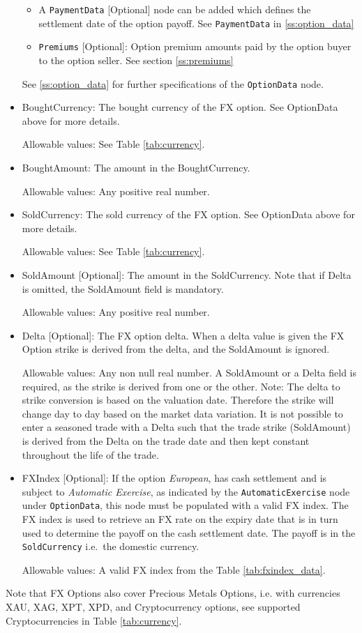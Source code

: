 \begin{itemize}
\begin{itemize}
\item A \lstinline!PaymentData! [Optional] node can be added which defines the settlement date of the option payoff. See  \lstinline!PaymentData! in \ref{ss:option_data}

\item \lstinline!Premiums! [Optional]: Option premium amounts paid by the option buyer to the option seller. See section \ref{ss:premiums}


\end{itemize}

 See \ref{ss:option_data} for further specifications of the \lstinline!OptionData! node.


\item BoughtCurrency: The bought currency of the FX option. See OptionData above for more details.

Allowable values: See Table \ref{tab:currency}.

\item BoughtAmount: The amount in the BoughtCurrency.

Allowable values: Any positive real number.

\item SoldCurrency: The sold currency of the FX option. See OptionData above for more details.

Allowable values: See Table \ref{tab:currency}.

\item SoldAmount [Optional]: The amount in the SoldCurrency. Note that if Delta is omitted, the SoldAmount field is mandatory.

Allowable values: Any positive real number.

\item Delta [Optional]: The FX option delta. When a delta value is given the FX Option strike is derived from the delta, and the SoldAmount is ignored.

Allowable values: Any non null real number. A SoldAmount or a Delta field is required, as the strike is derived from one or the other.
Note: The delta to strike conversion is based on the valuation date. Therefore the strike will change day to day based on the market data variation.  It is not possible to enter a seasoned trade with a Delta such that the trade strike (SoldAmount) is derived from the Delta on the trade date and then kept constant throughout the life of the trade. 

\item FXIndex [Optional]: If the option \textit{European}, has cash settlement and is subject to \textit{Automatic Exercise}, as indicated by the \lstinline!AutomaticExercise! node under \lstinline!OptionData!, this node must be populated with a valid FX index. The FX index is used to retrieve an FX rate on the expiry date that is in turn used to determine the payoff on the cash settlement date. The payoff is in the \lstinline!SoldCurrency! i.e.\ the domestic currency.

Allowable values: A valid FX index from the Table \ref{tab:fxindex_data}.

\end{itemize}

Note that FX Options also cover Precious Metals Options, i.e. with currencies XAU, XAG, XPT, XPD, and Cryptocurrency options,  see supported Cryptocurrencies in Table \ref{tab:currency}.
